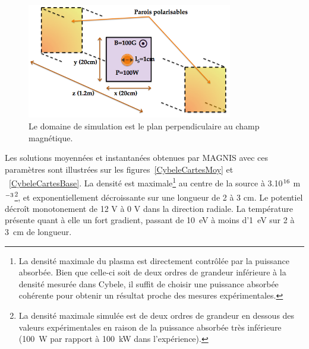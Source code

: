 \begin{refsection}
\begin{figure}[!htbp]
\centering
\includegraphics[width=0.8\textwidth]{figures/4-cybeleSimDomain.png}
{\caption{Le domaine de simulation est le plan perpendiculaire au champ
magnétique.}
\label{4-cybeleSimDomain}}
\end{figure}

Les solutions moyennées et instantanées obtenues par MAGNIS avec ces paramètres
sont illustrées sur les figures~\ref{CybeleCartesMoy} et
~\ref{CybeleCartesBase}. La densité est maximale\footnote{La densité maximale du plasma est directement contrôlée par la puissance
absorbée. Bien que celle-ci soit de deux ordres de grandeur inférieure à la
densité mesurée dans Cybele, il suffit de choisir une puissance absorbée
cohérente pour obtenir un résultat proche des mesures expérimentales.} au centre
de la source à 3.10$^{{16}}$ m$^{{-3}}$\footnote{La densité
maximale simulée est de deux ordres de grandeur en dessous des valeurs
expérimentales en raison de la puissance absorbée très inférieure (100~W par
rapport à 100~kW dans l'expérience).}, et exponentiellement
décroissante sur une longueur de 2 à 3 cm.
Le potentiel décroît monotonement de 12 V à 0 V dans la direction radiale.
 La température présente quant à elle un fort gradient, passant de 10~eV à moins
 d'1~eV sur 2 à 3~cm de longueur.


\end{refsection}
